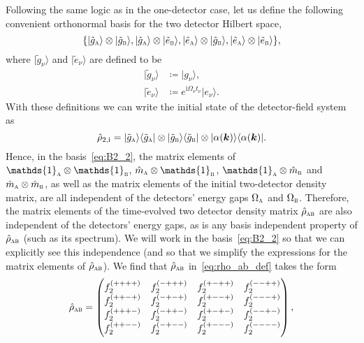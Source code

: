\documentclass[pra,nofootinbib,floats,aps,twocolumn,tightenlines,superscriptaddress]{revtex4-1}
\newcommand{\ket}[1]{| {#1} \rangle}
\newcommand{\bra}[1]{\langle {#1} |}
\newcommand{\ii}{\mathrm{i}}
\newcommand{\rhoab}{\hat{\rho}_\textsc{ab}}
\newcommand{\ma}{\hat{m}_\textsc{a}}
\newcommand{\mb}{\hat{m}_\textsc{b}}
\newcommand{\gak}{\ket{\tilde{g}_\textsc{a}}}
\newcommand{\eak}{\ket{\tilde{e}_\textsc{a}}}
\newcommand{\gbk}{\ket{\tilde{g}_\textsc{b}}}
\newcommand{\ebk}{\ket{\tilde{e}_\textsc{b}}}
\newcommand{\gab}{\bra{\tilde{g}_\textsc{a}}}
\newcommand{\gbb}{\bra{\tilde{g}_\textsc{b}}}
\begin{document}
Following the same logic as in the one-detector case, let us define the following convenient orthonormal basis for the two detector Hilbert space,
\begin{equation}
\label{eq:B2_2}
    \{
    \gak\otimes\gbk,
    \gak\otimes\ebk,
    \eak\otimes\gbk,
    \eak\otimes\ebk
    \},
\end{equation}
where $\ket{\tilde{g}_\nu}$ and $\ket{\tilde{e}_\nu}$ are defined to be
\begin{align}
    \label{eq:gnuk}
    \ket{\tilde{g}_\nu}
    &\coloneqq
    \ket{g_\nu},
    \\
    \label{eq:enuk}
    \ket{\tilde{e}_\nu}
    &\coloneqq
    e^{\ii\Omega_\nu t_\nu}
    \ket{e_\nu}.
\end{align}
With these definitions we can write the initial state of the detector-field system as
\begin{equation}
\label{eq:rho_2i_tilde}
    \hat{\rho}_\text{2,i}
    =
    \gak\gab
    \otimes
    \gbk\gbb
    \otimes
    \ket{\alpha(\bm k)}\bra{\alpha(\bm k)}.
\end{equation}
Hence, in the basis~\eqref{eq:B2_2}, the matrix elements of \mbox{$\mathds{1}_\textsc{a}\otimes\mathds{1}_\textsc{b}$}, $\ma\otimes\mathds{1}_\textsc{b}$, $\mathds{1}_\textsc{a}\otimes\mb$ and $\ma\otimes\mb$, as well as the matrix elements of the initial two-detector density matrix, are all independent of the detectors' energy gaps $\Omega_\textsc{a}$ and $\Omega_\textsc{b}$. Therefore, the matrix elements of the time-evolved two detector density matrix $\rhoab$ are also independent of the detectors' energy gaps, as is any basis independent property of $\rhoab$ (such as its spectrum). We will work in the basis~\eqref{eq:B2_2} so that we can explicitly see this independence (and so that we simplify the expressions for the matrix elements of $\rhoab$). We find that $\rhoab$ in~\eqref{eq:rho_ab_def} takes the form
\begin{equation}
\label{eq:rhoab}
    \rhoab
    =
    \begin{pmatrix}
    f_2^{(++++)} & f_2^{(-+++)} & f_2^{(+-++)} & f_2^{(--++)}
    \\
    f_2^{(++-+)} & f_2^{(-+-+)} & f_2^{(+--+)} & f_2^{(---+)}
    \\
    f_2^{(+++-)} & f_2^{(-++-)} & f_2^{(+-+-)} & f_2^{(--+-)}
    \\
    f_2^{(++--)} & f_2^{(-+--)} & f_2^{(+---)} & f_2^{(----)}
    \end{pmatrix},
\end{equation}
\end{document}
